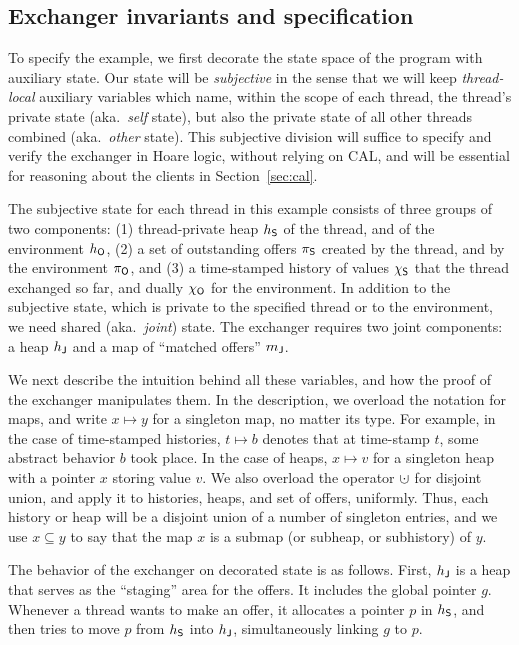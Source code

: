 \subsection{Exchanger invariants and specification}

To specify the example, we first decorate the state space of the
program with auxiliary state. Our state will be \emph{subjective} in
the sense that we will keep \emph{thread-local} auxiliary variables
which name, within the scope of each thread, the thread's private
state (aka.~\emph{self} state), but also the private state of all
other threads combined (aka.~\emph{other} state). This subjective
division will suffice to specify and verify the exchanger in Hoare
logic, without relying on CAL, and will be essential for reasoning
about the clients in Section~\ref{sec:cal}.
%

The subjective state for each thread in this example consists of three
groups of two components: (1) thread-private heap $h_{\mathsf{S}}$ of the
thread, and of the environment $h_{\mathsf{O}}$, (2) a set of outstanding
offers $\pi_{\mathsf{S}}$ created by the thread, and by the environment
$\pi_{\mathsf{O}}$, and (3) a time-stamped history of values $\chi_{\mathsf{S}}$ that the
thread exchanged so far, and dually $\chi_{\mathsf{O}}$ for the environment.  In
addition to the subjective state, which is private to the specified
thread or to the environment, we need shared (aka.~\emph{joint})
state. The exchanger requires two joint components: a heap $h_{\mathsf{J}}$
and a map of ``matched offers'' ${m_{\mathsf{J}}}$.

We next describe the intuition behind all these variables, and how the
proof of the exchanger manipulates them. In the description, we
overload the notation for maps, and write $x \mapsto y$ for a
singleton map, no matter its type. For example, in the case of
time-stamped histories, $t \mapsto b$ denotes that at time-stamp $t$,
some abstract behavior $b$ took place. In the case of heaps, $x
\mapsto v$ for a singleton heap with a pointer $x$ storing value
$v$. We also overload the operator $\hunion$ for disjoint union, and
apply it to histories, heaps, and set of offers, uniformly. Thus, each
history or heap will be a disjoint union of a number of singleton
entries, and we use $x \subseteq y$ to say that the map $x$ is a
submap (or subheap, or subhistory) of $y$.

The behavior of the exchanger on decorated state is as follows. 
%
First, $h_{\mathsf{J}}$ is a heap that serves as the ``staging'' area for the
offers. It includes the global pointer $g$. Whenever a thread wants to
make an offer, it allocates a pointer $p$ in $h_{\mathsf{S}}$, and then tries
to move $p$ from $h_{\mathsf{S}}$ into $h_{\mathsf{J}}$, simultaneously linking $g$ to
$p$.

